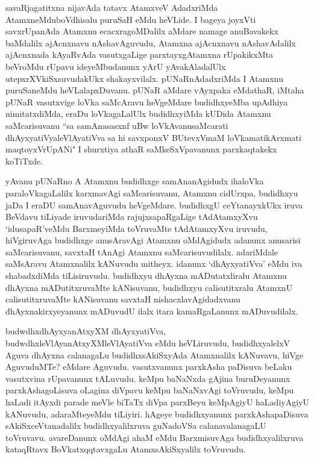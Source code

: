
\begin{artha}
savaRjagatitxna nijavAda tatavx AtamxveV AdadxriMda AtamxneMdu\break boVdhisalu puruSaH eMdu heVLide. I bageya joyxVti savxrUpanAda Atamxnu ecacxragoMDalilx aMdare namage anuBavakekx baMdalilx ajAcnxnavu nAshavAguvudu, Atamxna ajAcnxnavu nAshavAdalilx ajAcnxnada kAyaRvAda vasutxgaLige parxtayxgAtamxna rUpakikxMta beVroMdu rUpavu ideyeMbudanunx yArU yAvakAladalUlx utepxrXVkiSxsuvudakUkx shakayxvilalx. pUNaRnAdadxriMda I Atamxnu puruSaneMdu heVLalapxDuvanu. pUNaR aMdare vAyxpaka eMdathaR, iMtaha pUNaR vasutxvige loVka saMcAravu heVgeMdare budidhxyeMba upAdhiya nimitatxdiMda, eraDu loVkagaLalUlx budidhxyiMda kUDida Atamxnu saMcarisuvanu ``sa samAnasasxnf uBw loVkAvanusaMcarati dhAyxyatiVyaleVlAyatiVva sa hi savxponxV BUtevxVmaM loVkamatikArxmati maqtoyxVrUpANi" I shurxtiya athaR saMkeSxVpavanunx parxkaqtakekx koTiTxde.
\end{artha}%



\begin{artha}
yAvanu pUNaRno A Atamxnu budidhxge samAnanAgidudx ihaloVka paraloVkagaLalilx karxmavAgi saMcarisuvanu, Atamxnu cidUrxpa, budidhxyu jaDa I eraDU samAnavAguvudu heVgeMdare. budidhxgU ceYtanayxkUkx iruva BeVdavu tiLiyade iruvudariMda rajujxsapaRgaLige tAdAtamxyXvu `idusapaR'veMdu BarxmeyiMda toVruvaMte tAdAtamxyXvu iruvudu, hiVgiruvAga budidhxge anusAravAgi Atamxnu oMdAgidudx adanunx anusarisi saMcarisuvanu, savxtaH tAnAgi Atamxnu saMcarisuvudilalx. adariMdale saMsAravu Atamxnalilx kANuvudu mitheyx. idanunx `dhAyxyatiVva' eMdu iva shabadxdiMda tiLisiruvudu. budidhxyu dhAyxna mADutatxliralu Atamxnu dhAyxna mADutitxruvaMte kANisuvanu, budidhxyu calisutitxralu AtamxnU calisutitxruvaMte kANisuvanu savxtaH nishacxlavAgidadxvanu dhAyxnakirxyeyanunx mADuvudU ilalx itara kamaRgaLanunx mADuvudilalx. 
\end{artha}

\begin{artha}%
budwdhxdhAyxyanAtxyXM dhAyxyatiVva, budwdhxleVlAyanAtxyXM\break leVlAyatiVva eMdu heVLiruvudu, budidhxyalelxV Aguva dhAyxna calanagaLu budidhxsAkiSxyAda Atamxnalilx kANuvavu, hiVge AguvuduMTe? eMdare Aguvudu. vasutxvanunx parxkAsha paDisuva beLaku vasutxvina rUpavanunx tALuvudu. keMpu baNaNxda gAjina buruDeyanunx parxkAshagoLisuva oLagina diVpavu keMpu baNaNxvAgi toVruvudu, keMpu haLadi itAyxdi parade meVle biTaTx diVpa parxBeyu keMpAgiyU haLadiyAgiyU kANuvudu, adaraMteyeMdu tiLiyiri. hAgeye budidhxyanunx parxkAshapaDisuva sAkiSxceVtanadalilx budidhxyalilxruva guNadoVSa calanavalanagaLU toVruvavu. avareDanunx oMdAgi ahaM eMdu BarxmisuvAga budidhxyalilxruva kataqRtavx BoVkatxqqtavxgaLu AtamxsAkiSxyalilx toVruvudu. 
\end{artha}

